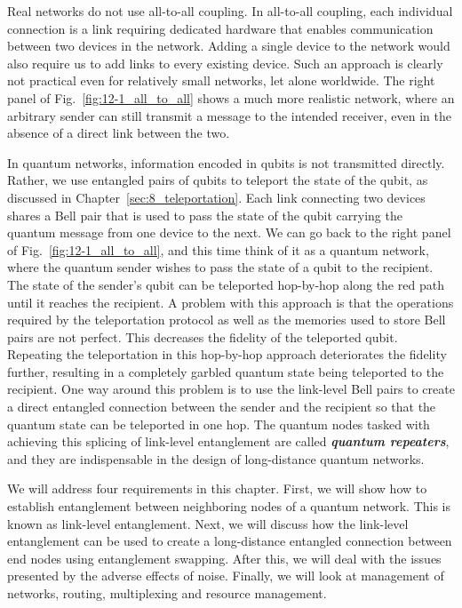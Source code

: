 Real networks do not use all-to-all coupling.
In all-to-all coupling, each individual connection is a link requiring dedicated hardware that enables communication between two devices in the network.
Adding a single device to the network would also require us to add links to every existing device.
Such an approach is clearly not practical even for relatively small networks, let alone worldwide.
The right panel of Fig.~\ref{fig:12-1_all_to_all} shows a much more realistic network, where an arbitrary sender can still transmit a message to the intended receiver, even in the absence of a direct link between the two.

In quantum networks, information encoded in qubits is not transmitted directly.
Rather, we use entangled pairs of qubits to teleport the state of the qubit, as discussed in Chapter~\ref{sec:8_teleportation}.
Each link connecting two devices shares a Bell pair that is used to pass the state of the qubit carrying the quantum message from one device to the next.
We can go back to the right panel of Fig.~\ref{fig:12-1_all_to_all}, and this time think of it as a quantum network, where the quantum sender wishes to pass the state of a qubit to the recipient.
The state of the sender's qubit can be teleported hop-by-hop along the red path until it reaches the recipient.
A problem with this approach is that the operations required by the teleportation protocol as well as the memories used to store Bell pairs are not perfect.
This decreases the fidelity of the teleported qubit.
Repeating the teleportation in this hop-by-hop approach deteriorates the fidelity further, resulting in a completely garbled quantum state being teleported to the recipient.
One way around this problem is to use the link-level Bell pairs to create a direct entangled connection between the sender and the recipient so that the quantum state can be teleported in one hop.
The quantum nodes tasked with achieving this splicing of link-level entanglement are called \textit{\textbf{quantum repeaters}}, and they are indispensable in the design of long-distance quantum networks.

We will address four requirements in this chapter.
First, we will show how to establish entanglement between neighboring nodes of a quantum network. This is known as link-level entanglement.
Next, we will discuss how the link-level entanglement can be used to create a long-distance entangled connection between end nodes using entanglement swapping.
After this, we will deal with the issues presented by the adverse effects of noise.
Finally, we will look at management of networks, routing, multiplexing and resource management.


